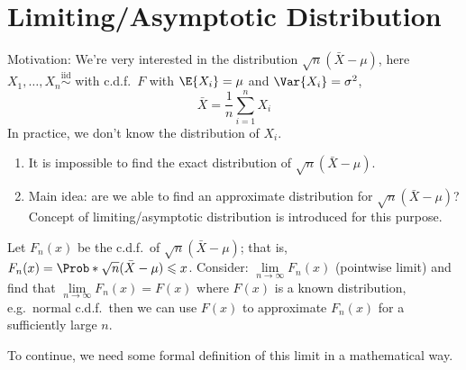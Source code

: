 \chapter{Limiting/Asymptotic Distribution}
Motivation: We're very interested in the distribution
$ \sqrt{n}(\bar{X}-\mu) $, here $ X_1,\ldots,X_n
    \stackrel{\text{iid}}{\sim} $ with c.d.f.\ $ F $ with
$ \E{X_i}=\mu $ and $ \Var{X_i}=\sigma^2 $,
\[ \bar{X}=\frac{1}{n} \sum_{i=1}^{n} X_i \]
In practice, we don't know the distribution of $ X_i $.
\begin{Remark}{}{}
    \begin{enumerate}[label=(\roman*)]
        \item It is impossible to find the exact distribution of
              $ \sqrt{n}(\bar{X}-\mu) $.
        \item Main idea: are we able to find an approximate
              distribution for $ \sqrt{n}(\bar{X}-\mu) $?
              Concept of limiting/asymptotic distribution
              is introduced for this purpose.
    \end{enumerate}
\end{Remark}
Let $ F_n(x) $ be the c.d.f.\ of $ \sqrt{n}(\bar{X}-\mu) $;
that is, $ F_n(x)=\Prob*{\sqrt{n}(\bar{X}-\mu)\leqslant x} $.
Consider: $ \lim\limits_{{n} \to {\infty}} F_n(x) $ (pointwise
limit) and find that $ \lim\limits_{{n} \to {\infty}} F_n(x)=F(x) $
where $ F(x) $ is a known distribution, e.g.\ normal c.d.f.\
then we can use $ F(x) $ to approximate $ F_n(x) $ for a sufficiently
large $ n $.

To continue, we need some formal definition of this limit
in a mathematical way.

